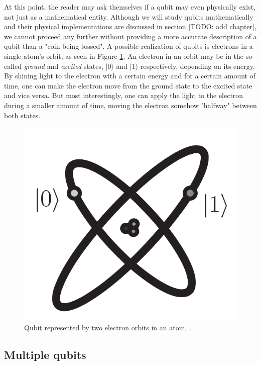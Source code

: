 At this point, the reader may ask themselves if a qubit may even physically exist, not just as a mathematical entity. Although we will study qubits mathematically and their physical implementations are discussed in section [TODO: add chapter], we cannot proceed any further without providing a more accurate description of a qubit than a "coin being tossed". A possible realization of qubits is electrons in a single atom's orbit, as seen in Figure \ref{fig 1.1}. An electron in an orbit may be in the so-called \emph{ground} and \emph{excited} states, $|0\rangle$ and $|1\rangle$ respectively, depending on its energy. By shining light to the electron with a certain energy and for a certain amount of time, one can make the electron move from the ground state to the excited state and vice versa. But most interestingly, one can apply the light to the electron during a smaller amount of time, moving the electron somehow "halfway" between both states.


\begin{figure}[h]
	\includegraphics[scale=.4]{../imgs/atom.png}
	\centering
	\caption{Qubit represented by two electron orbits in an atom, \cite{Nielsen2002}.}
	\label{fig 1.1}
\end{figure}

\subsection{Multiple qubits}

